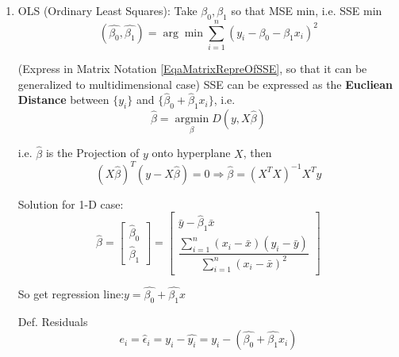     \begin{enumerate}
        \item OLS (Ordinary Least Squares): Take $\beta_0,\beta_1$ so that MSE min, i.e. SSE min
        \begin{equation}
            (\hat{\beta_0},\hat{\beta_1})=\arg\min\sum_{i=1}^n(y_i-\beta_0-\beta_1 x_i)^2    
        \end{equation}

        (Express in Matrix Notation \autoref{EqaMatrixRepreOfSSE}, so that it can be generalized to multidimensional case) SSE can be expressed as the \textbf{Eucliean Distance }between $ \{y_i\} $ and $ \{\hat{\beta}_0+\hat{\beta}_1x_i\}  $, i.e.
        \begin{equation}
            \hat{\beta }=\mathop{ \arg\min }\limits_{\beta }  D(y
            ,X \hat{\beta})
        \end{equation}

         i.e. $ \hat{\beta} $ is the Projection of $y $ onto hyperplane $ X $, then
         \begin{equation}
            ( X\hat{\beta} )^T(y- X\hat{\beta})=0 \Rightarrow \hat{\beta}=(X^TX)^{-1}X^Ty 
         \end{equation}
        

        Solution for 1-D case:
        \begin{equation}
            \hat{\beta}=\begin{bmatrix}
                \hat{\beta}_0\\ \hat{\beta}_1
            \end{bmatrix}
            =
            \begin{bmatrix}
            \bar{y}- \hat{\beta}_1\bar{x}\\
            \dfrac{\sum\limits_{i=1}^n(x_i-\bar{x})(y_i-\bar{y})}{\sum\limits_{i=1}^n(x_i-\bar{x})^2}
            \end{bmatrix}
        \end{equation}


        So get regression line:$y=\hat{\beta_0}+\hat{\beta_1}x$

        Def. Residuals
        \begin{equation}e_i=\hat{\epsilon}_i=y_i-\hat{y_i}=y_i-(\hat{\beta_0}+\hat{\beta_1}x_i)\end{equation}



\end{enumerate}
